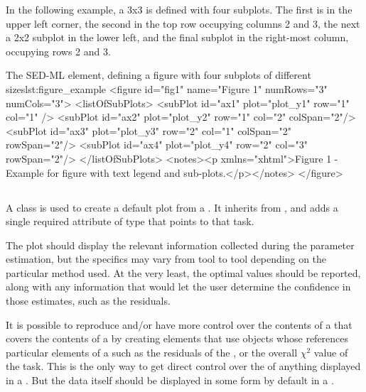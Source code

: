 \begin{blockChanged}
In the following example, a 3x3 \Figure is defined with four subplots.  The first is in the upper left corner, the second in the top row occupying columns 2 and 3, the next a 2x2 subplot in the lower left, and the final subplot in the right-most column, occupying rows 2 and 3.

\begin{myXmlLst}{The SED-ML  element, defining a figure with four subplots of different sizes}{lst:figure_example}
<figure id="fig1" name="Figure 1" numRows="3" numCols="3">
    <listOfSubPlots>
        <subPlot id="ax1" plot="plot_y1" row="1" col="1" />
        <subPlot id="ax2" plot="plot_y2" row="1" col="2" colSpan="2"/>
        <subPlot id="ax3" plot="plot_y3" row="2" col="1" colSpan="2" rowSpan="2"/>
        <subPlot id="ax4" plot="plot_y4" row="2" col="3" rowSpan="2"/>
    </listOfSubPlots>
    <notes><p xmlns="xhtml">Figure 1 - Example for figure with text legend and sub-plots.</p></notes>
</figure>
\end{myXmlLst}



\subsection{}
\label{class:parameterEstimationResultsPlot}
A \ParameterEstimationResultsPlot class is used to create a default plot from a \ParameterEstimationTask.  It inherits from \Plot, and adds a single required attribute  of type \SIdRef that points to that task.


The plot should display the relevant information collected during the parameter estimation, but the specifics may vary from tool to tool depending on the particular method used.  At the very least, the optimal \AdjustableParameter values should be reported, along with any information that would let the user determine the confidence in those estimates, such as the residuals.

It is possible to reproduce and/or have more control over the contents of a \Plot that covers the contents of a \ParameterEstimationTask by creating \DataGenerator elements that use \DependentVariable objects whose  references particular elements of a \ParameterEstimationTask such as the residuals of the \Objective, or the overall $\chi^2$ value of the task.  This is the only way to get direct control over the \Style of anything displayed in a \ParameterEstimationResultsPlot.  But the data itself should be displayed in some form by default in a \ParameterEstimationReport.



\end{blockChanged}
